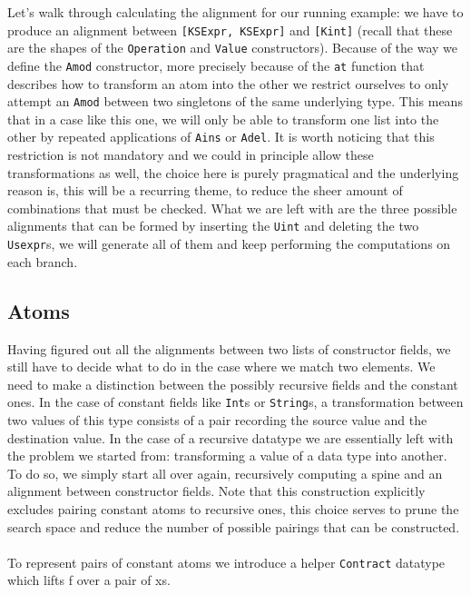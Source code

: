 \documentclass[11pt]{article}
\begin{document}
Let's walk through calculating the alignment for our running example: we have to 
produce an alignment between \texttt{[KSExpr, KSExpr]} and \texttt{[Kint]} (recall that these are the shapes of the 
\texttt{Operation} and \texttt{Value} constructors). Because of the way we 
define the \texttt{Amod} constructor, more precisely because of the \texttt{at} 
function that describes how to transform an atom into the other we restrict 
ourselves to only attempt an \texttt{Amod} between two singletons of the same underlying 
type. This means that in a case like this one, we will only be able to transform 
one list into the other by repeated applications of \texttt{Ains} or 
\texttt{Adel}. It is worth noticing that this restriction is not mandatory and 
we could in principle allow these transformations as well, the choice here is purely pragmatical and the underlying reason is,
this will be a recurring theme, to reduce the sheer amount of combinations that must be checked.
What we are left with are the three possible alignments that can be formed by inserting the \texttt{Uint}
and deleting the two \texttt{Usexpr}s, we will generate all of them and keep performing 
the computations on each branch. 

\subsection{Atoms}\label{atoms}

Having figured out all the alignments between two lists of constructor
fields, we still have to decide what to do in the case where we match two
elements. We need to make a distinction between the possibly
recursive fields and the constant ones.
In the case of constant fields
like \texttt{Int}s or \texttt{String}s, a transformation between two
values of this type consists of a pair recording the source value and the
destination value. In the case of a recursive datatype we are
essentially left with the problem we started from: transforming a value
of a data type into another. To do so, we simply start all over again,
recursively computing a spine and an alignment between constructor
fields. Note that this construction explicitly excludes pairing constant atoms 
to recursive ones, this choice serves to prune the search space and reduce the 
number of possible pairings that can be constructed.
\\\\
To represent pairs of constant atoms we introduce a helper \texttt{Contract} datatype which 
lifts f over a pair of xs.
\end{document}
